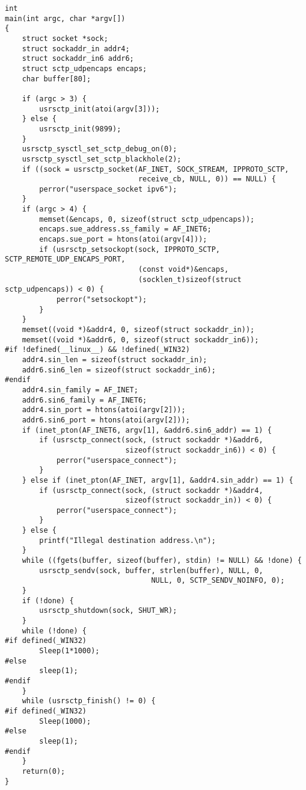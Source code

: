 \documentclass[a4paper]{article}
\begin{document}
\begin{verbatim}
int
main(int argc, char *argv[])
{
    struct socket *sock;
    struct sockaddr_in addr4;
    struct sockaddr_in6 addr6;
    struct sctp_udpencaps encaps;
    char buffer[80];

    if (argc > 3) {
        usrsctp_init(atoi(argv[3]));
    } else {
        usrsctp_init(9899);
    }
    usrsctp_sysctl_set_sctp_debug_on(0);
    usrsctp_sysctl_set_sctp_blackhole(2);
    if ((sock = usrsctp_socket(AF_INET, SOCK_STREAM, IPPROTO_SCTP, 
                               receive_cb, NULL, 0)) == NULL) {
        perror("userspace_socket ipv6");
    }
    if (argc > 4) {
        memset(&encaps, 0, sizeof(struct sctp_udpencaps));
        encaps.sue_address.ss_family = AF_INET6;
        encaps.sue_port = htons(atoi(argv[4]));
        if (usrsctp_setsockopt(sock, IPPROTO_SCTP, SCTP_REMOTE_UDP_ENCAPS_PORT, 
                               (const void*)&encaps, 
                               (socklen_t)sizeof(struct sctp_udpencaps)) < 0) {
            perror("setsockopt");
        }
    }
    memset((void *)&addr4, 0, sizeof(struct sockaddr_in));
    memset((void *)&addr6, 0, sizeof(struct sockaddr_in6));
#if !defined(__linux__) && !defined(_WIN32)
    addr4.sin_len = sizeof(struct sockaddr_in);
    addr6.sin6_len = sizeof(struct sockaddr_in6);
#endif
    addr4.sin_family = AF_INET;
    addr6.sin6_family = AF_INET6;
    addr4.sin_port = htons(atoi(argv[2]));
    addr6.sin6_port = htons(atoi(argv[2]));
    if (inet_pton(AF_INET6, argv[1], &addr6.sin6_addr) == 1) {
        if (usrsctp_connect(sock, (struct sockaddr *)&addr6, 
                            sizeof(struct sockaddr_in6)) < 0) {
            perror("userspace_connect");
        }
    } else if (inet_pton(AF_INET, argv[1], &addr4.sin_addr) == 1) {
        if (usrsctp_connect(sock, (struct sockaddr *)&addr4, 
                            sizeof(struct sockaddr_in)) < 0) {
            perror("userspace_connect");
        }
    } else {
        printf("Illegal destination address.\n");
    }
    while ((fgets(buffer, sizeof(buffer), stdin) != NULL) && !done) {
        usrsctp_sendv(sock, buffer, strlen(buffer), NULL, 0,
				                  NULL, 0, SCTP_SENDV_NOINFO, 0);
    }
    if (!done) {
        usrsctp_shutdown(sock, SHUT_WR);
    }
    while (!done) {
#if defined(_WIN32)
        Sleep(1*1000);
#else
        sleep(1);
#endif
    }
    while (usrsctp_finish() != 0) {
#if defined(_WIN32)
        Sleep(1000);
#else
        sleep(1);
#endif
    }
    return(0);
}

\end{verbatim}

\end{document}
